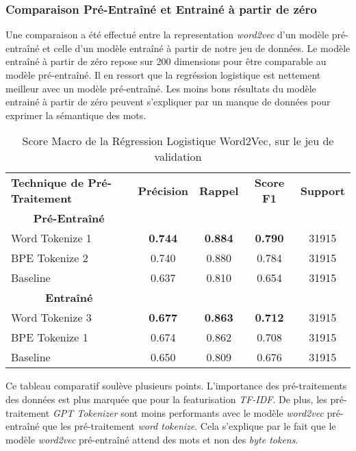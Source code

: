 \subsubsection{Comparaison Pré-Entraîné et Entrainé à partir de zéro}
Une comparaison a été effectué entre la representation \textit{word2vec} d'un modèle pré-entraîné et celle d'un modèle entraîné à partir de notre jeu de données. 
Le modèle entraîné à partir de zéro repose sur 200 dimensions pour être comparable au modèle pré-entraîné. 
Il en ressort que la regréssion logistique est nettement meilleur avec un modèle pré-entraîné. Les moins bons résultats du modèle entrainé à partir de zéro peuvent s'expliquer par un manque de données pour exprimer la sémantique des mots.
\begin{table}[ht]
    \centering
    \caption{Score Macro de la Régression Logistique Word2Vec, sur le jeu de validation}
    \begin{tabular}{lcccc}
    \hline
    \textbf{Technique de Pré-Traitement} & \textbf{Précision} & \textbf{Rappel} & \textbf{Score F1} & \textbf{Support}  \\
    \multicolumn{1}{c}{\textbf{Pré-Entraîné}} \\
    Word Tokenize 1             & \textbf{0.744}              & \textbf{0.884}           & \textbf{0.790}            & 31915            \\
    BPE Tokenize 2              & 0.740              & 0.880           & 0.784            & 31915            \\ \hline 
    Baseline                     & 0.637              & 0.810           & 0.654            & 31915            \\
    \hline \multicolumn{1}{c}{\textbf{Entraîné}} \\
    Word Tokenize 3             & \textbf{0.677}              & \textbf{0.863}           & \textbf{0.712}            & 31915            \\
    BPE Tokenize 1              & 0.674              & 0.862           & 0.708            & 31915            \\ \hline
    Baseline               & 0.650              & 0.809           & 0.676            & 31915            \\ 
    \hline \end{tabular}
    \label{tab:results}
\end{table}

Ce tableau comparatif soulève plusieurs points.
L'importance des pré-traitements des données est plus marquée que pour la featurisation \textit{TF-IDF}. 
De plus, les pré-traitement \textit{GPT Tokenizer} sont moins performants avec le modèle \textit{word2vec} pré-entraîné que les pré-traitement \textit{word tokenize}. 
Cela s'explique par le fait que le modèle \textit{word2vec} pré-entraîné attend des mots et non des \textit{byte tokens}.
